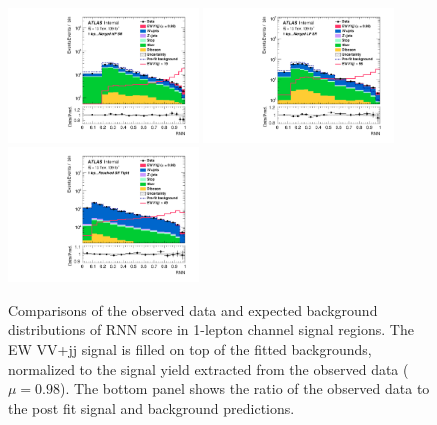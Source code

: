 \begin{figure}[]
    \centering
    \includegraphics[width=0.45\textwidth]{figures/PostFit/Region_distRNN_DSRVBSHP_BMin0_J0_incJet1_L1_T0_incFat1_Y6051_incTag1_Fat1_GlobalFit_unconditionnal_mu1log}
    \includegraphics[width=0.45\textwidth]{figures/PostFit/Region_distRNN_DSRVBSLP_BMin0_J0_incJet1_L1_T0_incFat1_Y6051_incTag1_Fat1_GlobalFit_unconditionnal_mu1log}
    \includegraphics[width=0.45\textwidth]{figures/PostFit/Region_distRNN_DSRVBSTight_BMin0_T0_Y6051_incTag1_J2_L1_incJet1_GlobalFit_unconditionnal_mu1log}
      \caption{Comparisons of the observed data and expected background distributions of RNN score in 1-lepton channel signal regions. The EW VV+jj signal is filled on top of the fitted backgrounds, normalized to the signal yield extracted from the observed data ($\mu = 0.98$). The bottom panel shows the ratio of the observed data to the post fit signal and background predictions.}
      \label{fig:postSR1lep}
\end{figure}

